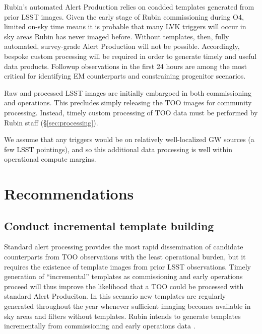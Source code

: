 \documentclass[DM,authoryear,toc]{lsstdoc}
\begin{document}
Rubin's automated Alert Production relies on coadded templates generated from prior LSST images.  
Given the early stage of Rubin commissioning during O4, limited on-sky time means it is probable that many LVK triggers will occur in sky areas Rubin has never imaged before.
Without templates, then, fully automated, survey-grade Alert Production will not be possible. 
Accordingly, bespoke custom processing will be required in order to generate timely and useful data products.
Followup observations in the first 24 hours are among the most critical for identifying EM counterparts and constraining progenitor scenarios. 

Raw and processed LSST images are initially embargoed in both commissioning and operations.
This precludes simply releasing the TOO images for community processing.
Instead, timely custom processing of TOO data must be performed by Rubin staff (\S \ref{sec:processing}).

We assume that any triggers would be on relatively well-localized GW sources (a few LSST pointings), and so this additional data processing is well within operational compute margins.

\section{Recommendations}



\subsection{Conduct incremental template building} \label{sec:templates}

Standard alert processing provides the most rapid dissemination of candidate counterparts from TOO observations with the least operational burden, but it requires the existence of template images from prior LSST observations.
Timely generation of ``incremental'' templates as commissioning and early operations proceed will thus improve the likelihood that a TOO could be processed with standard Alert Produciton.
In this scenario new templates are regularly generated throughout the year whenever sufficient imaging becomes available in sky areas and filters without templates.  
Rubin intends to generate templates incrementally from commissioning and early operations data .
\end{document}
